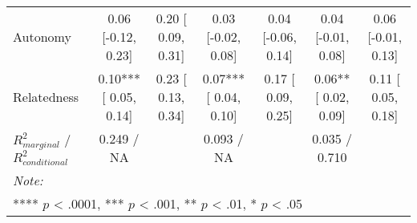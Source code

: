 \begin{landscape}
\begin{table}
\begin{minipage}[t][\textheight][t]{\textwidth}
{\begin{tabular}[t]{lcccccc}
\hspace{1em}Autonomy & 0.06 [-0.12,  0.23] & 0.20 [ 0.09, 0.31] & 0.03 [-0.02,  0.08] & 0.04 [-0.06, 0.14] & 0.04 [-0.01,  0.08] & 0.06 [-0.01, 0.13]\\
\hspace{1em}Relatedness & 0.10*** [ 0.05,  0.14] & 0.23 [ 0.13, 0.34] & 0.07*** [ 0.04,  0.10] & 0.17 [ 0.09, 0.25] & 0.06** [ 0.02,  0.09] & 0.11 [ 0.05, 0.18]\\
\hspace{1em}$R^2_{marginal}$ / $R^2_{conditional}$ & 0.249 / NA &  & 0.093 / NA &  & 0.035 / 0.710 & \\
\bottomrule
\multicolumn{7}{l}{\rule{0pt}{1em}\textit{Note: }}\\
\multicolumn{7}{l}{\rule{0pt}{1em}**** $p$ < .0001, *** $p$ < .001, ** $p$ < .01, * $p$ < .05}\\
\end{tabular}}
\end{minipage}
\end{table}
\end{landscape}
